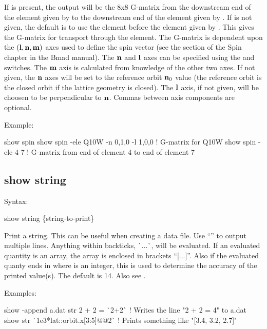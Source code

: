 {{{{{{{{{If  is present, the output will be the 8x8 G-matrix from the downstream end of the
element given by  to the downstream end of the element given by .
If  is not given, the default is to use the element before the element given by
. This gives the G-matrix for transport through the  element.  The
G-matrix is dependent upon the $({\bf l}, {\bf n}, {\bf m})$ axes used to define the spin vector (see the
 section of the Spin chapter in the Bmad manual). The ${\bf n}$ and ${\bf l}$ axes
can be specified using the  and  switches. The ${\bf m}$ axis is calculated
from knowledge of the other two axes. If not given, the ${\bf n}$ axes will be set to the reference
orbit ${\bf n}_0$ value (the reference orbit is the closed orbit if the lattice geometry is closed).
The ${\bf l}$ axis, if not given, will be choosen to be perpendicular to ${\bf n}$.  Commas between axis
components are optional.

Example:
\begin{example}
  show spin
  show spin -ele Q10W -n 0,1,0 -l 1,0,0  ! G-matrix for Q10W
  show spin -ele 4 7    ! G-matrix from end of element 4 to end of element 7
\end{example}


\subsection{show string}
\label{s:show.string}

Syntax:
\begin{example}
  show string \{string-to-print\}
\end{example}

Print a string. This can be useful when creating a data file. Use ``'' to output multiple
lines. Anything within backticks, \`{}...\`{}, will be evaluated. If an evaluated quantity is an array, the array
is enclosed in brackets ``[...]''. Also if the evaluated quanty ends in  where  is
an integer, this is used to determine the accuracy of the printed value(s). The default is 14. Also
see .

Examples:
\begin{example}
  show -append a.dat str 2 + 2 = \`{}2+2\`{} ! Writes the line "2 + 2 = 4" to a.dat
  show str \`{}1e3*lat::orbit.x[3:5]@@2\`{}  ! Prints something like "[3.4, 3.2, 2.7]"
\end{example}

}}}}}}}}}
